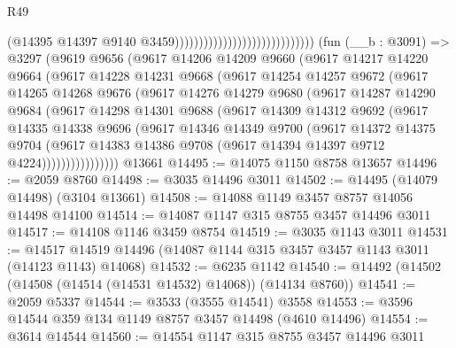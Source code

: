 \begin{lexlean}{R49}
\begin{coremodule}
                                                            (@14395
                                                              @14397
                                                              @9140
                                                              @3459)))))))))))))))))))))))))))))
    (fun (__b : @3091) =>
    @3297
      (@9619
        @9656
        (@9617
          @14206
          @14209
          @9660
          (@9617
            @14217
            @14220
            @9664
            (@9617
              @14228
              @14231
              @9668
              (@9617
                @14254
                @14257
                @9672
                (@9617
                  @14265
                  @14268
                  @9676
                  (@9617
                    @14276
                    @14279
                    @9680
                    (@9617
                      @14287
                      @14290
                      @9684
                      (@9617
                        @14298
                        @14301
                        @9688
                        (@9617
                          @14309
                          @14312
                          @9692
                          (@9617
                            @14335
                            @14338
                            @9696
                            (@9617
                              @14346
                              @14349
                              @9700
                              (@9617
                                @14372
                                @14375
                                @9704
                                (@9617
                                  @14383
                                  @14386
                                  @9708
                                  (@9617 @14394 @14397 @9712 @4224))))))))))))))))
    @13661
@14495 := @14075 @1150 @8758 @13657
@14496 := @2059 @8760
@14498 := @3035 @14496 @3011
@14502 := @14495 (@14079 @14498) (@3104 @13661)
@14508 := @14088 @1149 @3457 @8757 @14056 @14498 @14100
@14514 := @14087 @1147 @315 @8755 @3457 @14496 @3011
@14517 := @14108 @1146 @3459 @8754
@14519 := @3035 @1143 @3011
@14531 := @14517 @14519 @14496 (@14087 @1144 @315 @3457 @3457 @1143 @3011 (@14123 @1143) @14068)
@14532 := @6235 @1142
@14540 := @14492 (@14502 (@14508 (@14514 (@14531 @14532) @14068)) (@14134 @8760))
@14541 := @2059 @5337
@14544 := @3533 (@3555 @14541) @3558
@14553 := @3596 @14544 @359 @134 @1149 @8757 @3457 @14498 (@4610 @14496)
@14554 := @3614 @14544
@14560 := @14554 @1147 @315 @8755 @3457 @14496 @3011

\end{coremodule}
\end{lexlean}
